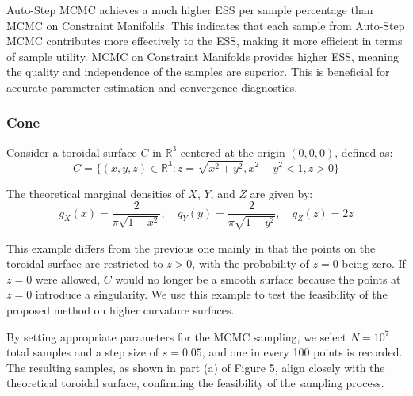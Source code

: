 \documentclass{article}
\begin{document}
Auto-Step MCMC achieves a much higher ESS per sample percentage than MCMC on Constraint Manifolds. This indicates that each sample from Auto-Step MCMC contributes more effectively to the ESS, making it more efficient in terms of sample utility. 
MCMC on Constraint Manifolds provides higher ESS, meaning the quality and independence of the samples are superior. This is beneficial for accurate parameter estimation and convergence diagnostics.




\subsubsection{Cone}

Consider a toroidal surface \( C \) in \( \mathbb{R}^3 \) centered at the origin \((0,0,0)\), defined as:
\[
C = \{(x,y,z) \in \mathbb{R}^3 : z = \sqrt{x^2 + y^2}, x^2 + y^2 < 1, z > 0\}
\]

The theoretical marginal densities of \( X \), \( Y \), and \( Z \) are given by:
\[
g_X(x) = \frac{2}{\pi \sqrt{1-x^2}}, \quad g_Y(y) = \frac{2}{\pi \sqrt{1-y^2}}, \quad g_Z(z) = 2z
\]

This example differs from the previous one mainly in that the points on the toroidal surface are restricted to \( z > 0 \), with the probability of \( z = 0 \) being zero. If \( z = 0 \) were allowed, \( C \) would no longer be a smooth surface because the points at \( z = 0 \) introduce a singularity. We use this example to test the feasibility of the proposed method on higher curvature surfaces.

By setting appropriate parameters for the MCMC sampling, we select \( N = 10^7 \) total samples and a step size of \( s = 0.05 \), and one in every 100 points is recorded. The resulting samples, as shown in part (a) of Figure 5, align closely with the theoretical toroidal surface, confirming the feasibility of the sampling process.

        
    
\end{document}
